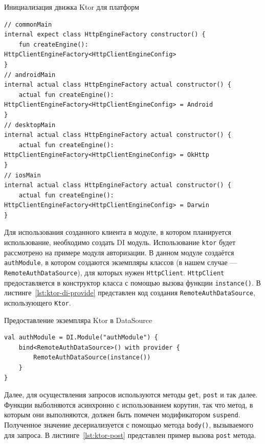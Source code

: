 \documentclass[14pt, russian]{scrartcl}
\begin{document}
\begin{listing}[!htb]
\caption{Инициализация движка Ktor для платформ}
\label{lst:ktor-engines}
\begin{verbatim}
// commonMain
internal expect class HttpEngineFactory constructor() {
    fun createEngine(): HttpClientEngineFactory<HttpClientEngineConfig>
}
// androidMain
internal actual class HttpEngineFactory actual constructor() {
    actual fun createEngine(): HttpClientEngineFactory<HttpClientEngineConfig> = Android
}
// desktopMain
internal actual class HttpEngineFactory actual constructor() {
    actual fun createEngine(): HttpClientEngineFactory<HttpClientEngineConfig> = OkHttp
}
// iosMain
internal actual class HttpEngineFactory actual constructor() {
    actual fun createEngine(): HttpClientEngineFactory<HttpClientEngineConfig> = Darwin
}
\end{verbatim}
\end{listing}

Для использования созданного клиента в модуле, в котором планируется использование, необходимо создать DI модуль. Использование \texttt{ktor} будет рассмотрено на примере модуля авторизации. В данном модуле создаётся \texttt{authModule}, в котором создаются экземпляры классов (в нашем случае --- \texttt{RemoteAuthDataSource}), для которых нужен \texttt{HttpClient}. \texttt{HttpClient} предоставляется в конструктор класса с помощью вызова функции \texttt{instance()}. В листинге~\ref{lst:ktor-di-provide} представлен код создания \texttt{RemoteAuthDataSource}, использующего \texttt{Ktor}.

\begin{listing}[!htb]
\caption{Предоставление экземпляра Ktor в DataSource}
\label{lst:ktor-di-provide}
\begin{verbatim}
val authModule = DI.Module("authModule") {
    bind<RemoteAuthDataSource>() with provider {
        RemoteAuthDataSource(instance())
    }
}
\end{verbatim}
\end{listing}

Далее, для осуществления запросов используются методы \texttt{get}, \texttt{post} и так далее. Функции выболняются асинхронно с использованием корутин, так что метод, в которым они выполняются, должен быть помечен модификатором \texttt{suspend}. Полученное значение десериализуется с помощью метода \texttt{body()}, вызываемого для запроса. В листинге~\ref{lst:ktor-post} представлен пример вызова \texttt{post} метода.
\end{document}
